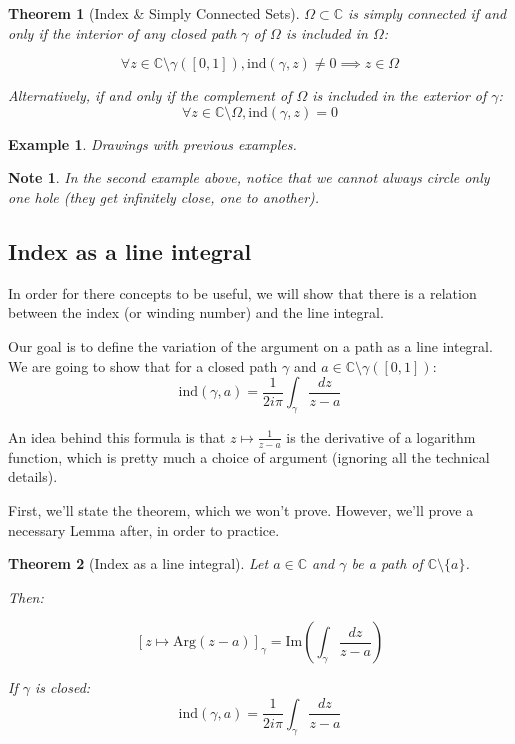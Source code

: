 \documentclass{article}
\newtheorem*{note}{Note}
\newtheorem*{example}{Example}
\newtheorem*{thm*}{Theorem}
\begin{document}
\begin{thm*}[Index \& Simply Connected Sets]
    $\Omega\subset\mathbb{C}$ is simply connected if and only if the interior of any closed path $\gamma$ of $\Omega$ is included in $\Omega$:

    $$\forall z \in \mathbb{C}\setminus\gamma([0,1]), \mathrm{ind}(\gamma, z) \neq 0 \implies z \in \Omega $$

Alternatively, if and only if the complement of $\Omega$ is included in the exterior of $\gamma$:
$$\forall z \in \mathbb{C}\setminus\Omega, \mathrm{ind}(\gamma, z) = 0$$
\end{thm*}

\begin{example}
    Drawings with previous examples.
\end{example}

\begin{note}
    In the second example above, notice that we cannot always circle only one hole (they get infinitely close, one to another).
\end{note}

\subsection{Index as a line integral}
In order for there concepts to be useful, we will show that there is a relation between the index (or winding number) and the line integral.

Our goal is to define the variation of the argument on a path as a line integral. We are going to show that for a closed path $\gamma$ and $a\in\mathbb{C}\setminus\gamma([0,1])$:
$$\mathrm{ind}(\gamma, a) = \frac{1}{2i\pi}\int_\gamma\frac{dz}{z - a}$$

An idea behind this formula is that $z \mapsto \frac{1}{z - a}$ is the derivative of a logarithm function, which is pretty much a choice of argument (ignoring all the technical details).

First, we'll state the theorem, which we won't prove. However, we'll prove a necessary Lemma after, in order to practice.


\begin{thm*}[Index as a line integral]
    Let $a\in\mathbb{C}$ and $\gamma$ be a path of $\mathbb{C} \setminus \lbrace a \rbrace$.

    Then:

    $$ [z \mapsto \mathrm{Arg}(z - a)]_\gamma = \mathrm{Im}\left(\int_\gamma \frac{dz}{z-a}\right)$$

    If $\gamma$ is closed:
    $$\boxed{\mathrm{ind}(\gamma, a) = \frac{1}{2i\pi}\int_\gamma\frac{dz}{z-a}}$$
\end{thm*}
\end{document}
